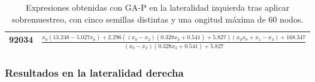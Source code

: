 \begin{table}[H]
{\begin{tabular}{|c|c|}
92034            & $\frac{x_{0} \left(13.248 - 5.027 x_{0}\right) + 2.296 \left(\left(x_{0} - x_{2}\right) \left(0.328 x_{3} + 0.541\right) + 5.827\right) \left(x_{0} x_{8} + x_{1} - x_{3}\right) + 168.347}{\left(x_{0} - x_{2}\right) \left(0.328 x_{3} + 0.541\right) + 5.827}$                                                                              \\ \hline
\end{tabular}%
}
\caption{Expresiones obtenidas con GA-P en la lateralidad izquierda tras aplicar sobremuestreo, con cinco semillas distintas y una ongitud máxima de 60 nodos.}\label{table:exp_GAP_over_l0_60}
\end{table}





\subsubsection{Resultados en la lateralidad derecha}


\begin{table}[H]
\centering
{}
\caption{Resultados de GA-P en la lateralidad derecha tras aplicar sobremuestreo, con cinco semillas distintas y una ongitud máxima de 20 nodos.}\label{table:resultados_GAP_over_l1_20}
\end{table}



